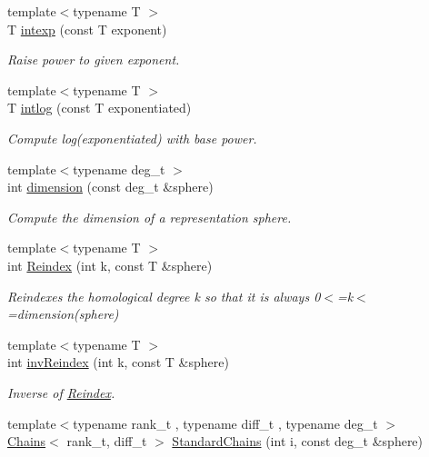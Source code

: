 \begin{DoxyCompactItemize}
{\footnotesize template$<$typename T $>$ }\\T \hyperlink{namespaceMackey_a4904fdc0fdcf3c23d7f3b80f59b2eafa}{intexp} (const T exponent)
\begin{DoxyCompactList}\small\item\em Raise power to given exponent. \end{DoxyCompactList}\item 
{\footnotesize template$<$typename T $>$ }\\T \hyperlink{namespaceMackey_aa0cac9097035c5fe8448742e22e6f78b}{intlog} (const T exponentiated)
\begin{DoxyCompactList}\small\item\em Compute log(exponentiated) with base power. \end{DoxyCompactList}\item 
{\footnotesize template$<$typename deg\+\_\+t $>$ }\\int \hyperlink{namespaceMackey_a6a5d40e69e5628ea84896ee43f4a91fa}{dimension} (const deg\+\_\+t \&sphere)
\begin{DoxyCompactList}\small\item\em Compute the dimension of a representation sphere. \end{DoxyCompactList}\item 
{\footnotesize template$<$typename T $>$ }\\int \hyperlink{namespaceMackey_acb84c147d9ee39eac2883a762e3710dd}{Reindex} (int k, const T \&sphere)
\begin{DoxyCompactList}\small\item\em Reindexes the homological degree k so that it is always 0$<$=k$<$=dimension(sphere) \end{DoxyCompactList}\item 
{\footnotesize template$<$typename T $>$ }\\int \hyperlink{namespaceMackey_a011b8e23bc2eedf751a9ce7bdc9e4cb9}{inv\+Reindex} (int k, const T \&sphere)
\begin{DoxyCompactList}\small\item\em Inverse of \hyperlink{namespaceMackey_a7da73ade3ee83c4ffd614e79242d7c04}{Reindex}. \end{DoxyCompactList}\item 
{\footnotesize template$<$typename rank\+\_\+t , typename diff\+\_\+t , typename deg\+\_\+t $>$ }\\\hyperlink{classMackey_1_1Chains}{Chains}$<$ rank\+\_\+t, diff\+\_\+t $>$ \hyperlink{namespaceMackey_aac9deeccbe291d1dd17df46a3d7c1f2b}{Standard\+Chains} (int i, const deg\+\_\+t \&sphere)

\end{DoxyCompactItemize}
